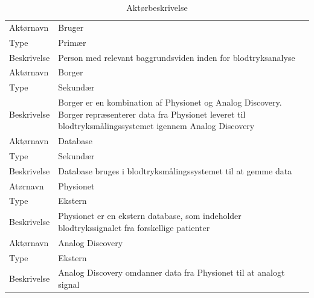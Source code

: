 \begin{table}[H]
\begin{tabularx}{\textwidth}{l X}
     Aktørnavn & Bruger \\
     Type & Primær \\
     Beskrivelse  & Person med relevant baggrundsviden inden for blodtryksanalyse \\ 
     \midrule
     Aktørnavn & Borger  \\
     Type & Sekundær \\
     Beskrivelse  & Borger er en kombination af Physionet og Analog Discovery. Borger repræsenterer data fra Physionet leveret til blodtryksmålingssystemet igennem Analog Discovery \\
     \midrule
     Aktørnavn & Database \\
     Type & Sekundær \\
     Beskrivelse  & Database bruges i blodtryksmålingssystemet til at gemme data \\ 
     \midrule
     Atørnavn & Physionet \\
     Type & Ekstern  \\
     Beskrivelse  & Physionet er en ekstern database, som indeholder blodtrykssignalet fra forskellige patienter \\
     \midrule
     Aktørnavn & Analog Discovery  \\
     Type & Ekstern \\
     Beskrivelse  & Analog Discovery omdanner data fra Physionet til at analogt signal \\                                                                                                                                                                          
     \bottomrule                                                                                                                   
    \end{tabularx}
    \caption {Aktørbeskrivelse}
    \label{tab:aktoerbeskrivelse}
	
\end{table}

